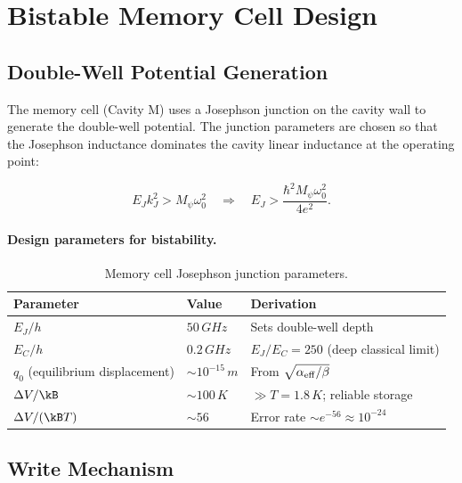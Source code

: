 \documentclass[12pt,a4paper]{article}
\begin{document}
\section{Bistable Memory Cell Design}

\subsection{Double-Well Potential Generation}

The memory cell (Cavity M) uses a Josephson junction on the cavity wall to generate the double-well potential. The junction parameters are chosen so that the Josephson inductance dominates the cavity linear inductance at the operating point:

\begin{equation}
E_J k_J^2 > M_\psi \omega_0^2 \quad \Rightarrow \quad E_J > \frac{\hbar^2 M_\psi \omega_0^2}{4e^2}.
\end{equation}

\paragraph{Design parameters for bistability.}
\begin{table}[H]
\centering
\caption{Memory cell Josephson junction parameters.}
\begin{tabular}{lll}
\toprule
\textbf{Parameter} & \textbf{Value} & \textbf{Derivation} \\
\midrule
$E_J / h$ & $50\,\si{GHz}$ & Sets double-well depth \\
$E_C / h$ & $0.2\,\si{GHz}$ & $E_J/E_C = 250$ (deep classical limit) \\
$q_0$ (equilibrium displacement) & $\sim 10^{-15}\,\si{m}$ & From $\sqrt{\alpha_{\rm eff}/\beta}$ \\
$\Delta V / \kB$ & $\sim 100\,\si{K}$ & $\gg T = 1.8\,\si{K}$; reliable storage \\
$\Delta V / (\kB T)$ & $\sim 56$ & Error rate $\sim e^{-56} \approx 10^{-24}$ \\
\bottomrule
\end{tabular}
\end{table}

\subsection{Write Mechanism}
\end{document}
